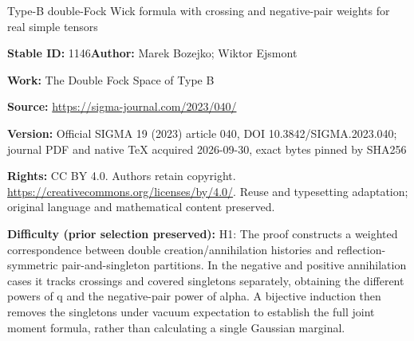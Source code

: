 \documentclass[11pt]{article}
\numberwithin{equation}{section}
\numberwithin{equation}{section}
\begin{document}
\begin{center}\Large Type-B double-Fock Wick formula with crossing and negative-pair weights for real simple tensors\end{center}
\noindent\textbf{Stable ID:} 1146\quad\textbf{Author:} Marek Bozejko; Wiktor Ejsmont\par
\noindent\textbf{Work:} The Double Fock Space of Type B\par
\noindent\textbf{Source:} \url{https://sigma-journal.com/2023/040/}\par
\noindent\textbf{Version:} Official SIGMA 19 (2023) article 040, DOI 10.3842/SIGMA.2023.040; journal PDF and native TeX acquired 2026-09-30, exact bytes pinned by SHA256\par
\noindent\textbf{Rights:} CC BY 4.0. Authors retain copyright. \url{https://creativecommons.org/licenses/by/4.0/}. Reuse and typesetting adaptation; original language and mathematical content preserved.\par
\noindent\textbf{Difficulty (prior selection preserved):} {\CJKfont H1: The proof constructs a weighted correspondence between double creation/annihilation histories and reflection-symmetric pair-and-singleton partitions. In the negative and positive annihilation cases it tracks crossings and covered singletons separately, obtaining the different powers of q and the negative-pair power of alpha. A bijective induction then removes the singletons under vacuum expectation to establish the full joint moment formula, rather than calculating a single Gaussian marginal.}\par
\end{document}
